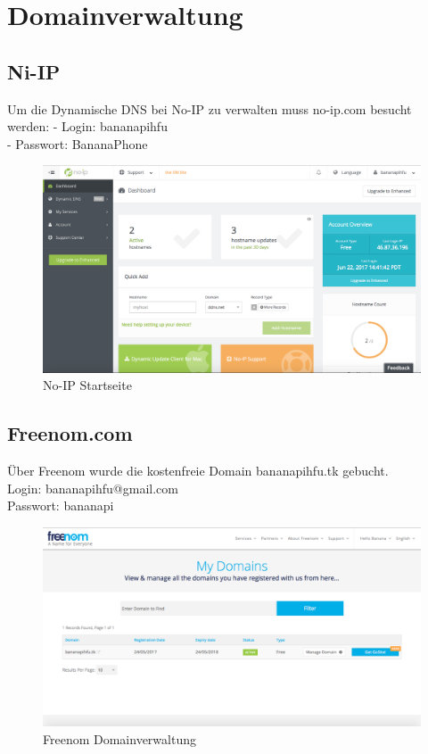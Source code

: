 \section{Domainverwaltung}
\subsection*{Ni-IP}
Um die Dynamische DNS bei No-IP zu verwalten muss no-ip.com besucht werden:
- Login: bananapihfu\\
- Passwort: BananaPhone
\begin{figure}[ht]
\includegraphics[width=\textwidth]{pictures/Jonas/Anleitung/BILD3}
\caption{No-IP Startseite}
\end{figure}
\newpage
\subsection*{Freenom.com}
Über Freenom wurde die kostenfreie Domain bananapihfu.tk gebucht.\\
Login: bananapihfu@gmail.com\\
Passwort: bananapi
\begin{figure}[ht]
\includegraphics[width=\textwidth]{pictures/Jonas/Anleitung/BILD4}
\caption{Freenom Domainverwaltung}
\end{figure}

